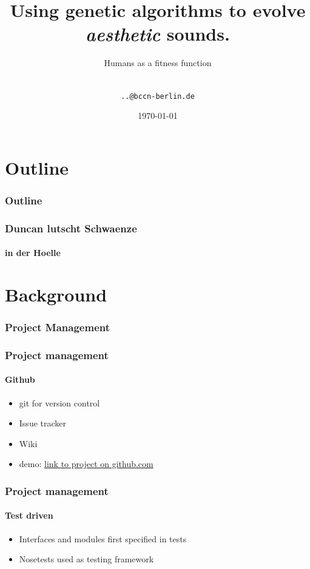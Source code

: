 \documentclass{beamer}
\title[Sound Evolution] {Using genetic algorithms to evolve \emph{aesthetic} sounds.}
\subtitle{Humans as a fitness function}
\author[Duncan, Matthias, Rafael, Mirko \& Stephan] { \\\texttt{..@bccn-berlin.de}}
\date[SS 2010] {\today}
\begin{document}
\frame{\titlepage}

\section*{Outline}
\begin{frame}
  \frametitle{Outline}
  \tableofcontents[pausesections]
\end{frame}


\begin{frame}
	\frametitle{Duncan lutscht Schwaenze}
	\framesubtitle{in der Hoelle}
	
\end{frame}


\section{Background} %
\label{sg:sec:background}

\subsubsection{Project Management} %
\label{sg:ssub:architecture_and_project_management}

\begin{frame}
	\frametitle{Project management}
	\framesubtitle{Github}
	
	\begin{itemize}
		\item<1-> git for version control
		\item<2-> Issue tracker
		\item<3-> Wiki
		\item<4-> demo: \href{http://github.com/buzz/sound-evolution}{link to project on github.com}
	\end{itemize}
	
\end{frame}

\begin{frame}
	\frametitle{Project management}
	\framesubtitle{Test driven}
	
	\begin{itemize}
		\item<1-> Interfaces and modules first specified in tests
		\item<2-> Nosetests used as testing framework
	\end{itemize}
	
\end{frame}

\end{document}
